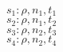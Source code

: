 \documentclass[varwidth]{standalone}
\begin{document}
$s_1 : \rho, n_1, t_1$\\
$s_2 : \rho, n_1, t_2$\\
$s_3 : \rho, n_2, t_3$\\
$s_4 : \rho, n_2, t_4$
\end{document}
